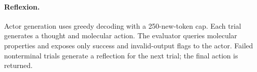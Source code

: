 \paragraph{Reflexion.}
Actor generation uses greedy decoding with a 250-new-token cap. Each trial generates a thought and molecular action. The evaluator queries molecular properties and exposes only success and invalid-output flags to the actor. Failed nonterminal trials generate a reflection for the next trial; the final action is returned.
